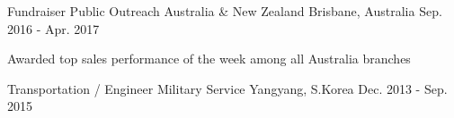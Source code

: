 

\begin{cventries}

  \cventry
    {Fundraiser} %
    {Public Outreach Australia \& New Zealand} %
    {Brisbane, Australia} %
    {Sep. 2016 - Apr. 2017} %
    {
      \begin{cvitems} %
        \item {Awarded top sales performance of the week among all Australia branches}
      \end{cvitems}
    }
    
  \cventry
    {Transportation / Engineer } %
    {Military Service} %
    {Yangyang, S.Korea} %
    {Dec. 2013 - Sep. 2015} %
    {
      \begin{cvitems} %
      \end{cvitems}
    }

\end{cventries}
